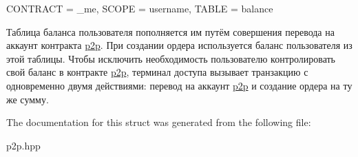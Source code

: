 C\+O\+N\+T\+R\+A\+CT = \+\_\+me, S\+C\+O\+PE = username, T\+A\+B\+LE = balance

Таблица баланса пользователя пополняется им путём совершения перевода на аккаунт контракта \mbox{\hyperlink{classp2p}{p2p}}. При создании ордера используется баланс пользователя из этой таблицы. Чтобы исключить необходимость пользователю контролировать свой баланс в контракте \mbox{\hyperlink{classp2p}{p2p}}, терминал доступа вызывает транзакцию с одновременно двумя действиями\+: перевод на аккаунт \mbox{\hyperlink{classp2p}{p2p}} и создание ордера на ту же сумму. 

The documentation for this struct was generated from the following file\+:\begin{DoxyCompactItemize}
\item 
p2p.\+hpp\end{DoxyCompactItemize}
